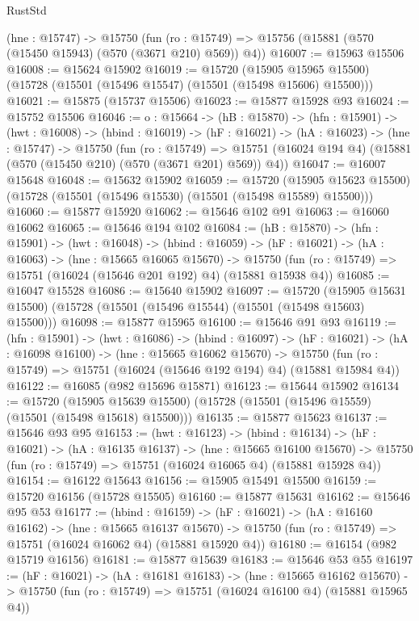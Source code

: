 \begin{lexlean}{RustStd}
\begin{coremodule}
  (hne : @15747) ->
  @15750 (fun (ro : @15749) => @15756 (@15881 (@570 (@15450 @15943) (@570 (@3671 @210) @569)) @4))
@16007 := @15963 @15506
@16008 := @15624 @15902
@16019 := @15720
    (@15905 @15965 @15500)
    (@15728 (@15501 (@15496 @15547) (@15501 (@15498 @15606) @15500)))
@16021 := @15875 (@15737 @15506)
@16023 := @15877 @15928 @93
@16024 := @15752 @15506
@16046 := {o : @15664} ->
  (hB : @15870) ->
  (hfn : @15901) ->
  (hwt : @16008) ->
  (hbind : @16019) ->
  (hF : @16021) ->
  (hA : @16023) ->
  (hne : @15747) ->
  @15750
    (fun (ro : @15749) =>
    @15751 (@16024 @194 @4) (@15881 (@570 (@15450 @210) (@570 (@3671 @201) @569)) @4))
@16047 := @16007 @15648
@16048 := @15632 @15902
@16059 := @15720
    (@15905 @15623 @15500)
    (@15728 (@15501 (@15496 @15530) (@15501 (@15498 @15589) @15500)))
@16060 := @15877 @15920
@16062 := @15646 @102 @91
@16063 := @16060 @16062
@16065 := @15646 @194 @102
@16084 := (hB : @15870) ->
  (hfn : @15901) ->
  (hwt : @16048) ->
  (hbind : @16059) ->
  (hF : @16021) ->
  (hA : @16063) ->
  (hne : @15665 @16065 @15670) ->
  @15750 (fun (ro : @15749) => @15751 (@16024 (@15646 @201 @192) @4) (@15881 @15938 @4))
@16085 := @16047 @15528
@16086 := @15640 @15902
@16097 := @15720
    (@15905 @15631 @15500)
    (@15728 (@15501 (@15496 @15544) (@15501 (@15498 @15603) @15500)))
@16098 := @15877 @15965
@16100 := @15646 @91 @93
@16119 := (hfn : @15901) ->
  (hwt : @16086) ->
  (hbind : @16097) ->
  (hF : @16021) ->
  (hA : @16098 @16100) ->
  (hne : @15665 @16062 @15670) ->
  @15750 (fun (ro : @15749) => @15751 (@16024 (@15646 @192 @194) @4) (@15881 @15984 @4))
@16122 := @16085 (@982 @15696 @15871)
@16123 := @15644 @15902
@16134 := @15720
    (@15905 @15639 @15500)
    (@15728 (@15501 (@15496 @15559) (@15501 (@15498 @15618) @15500)))
@16135 := @15877 @15623
@16137 := @15646 @93 @95
@16153 := (hwt : @16123) ->
  (hbind : @16134) ->
  (hF : @16021) ->
  (hA : @16135 @16137) ->
  (hne : @15665 @16100 @15670) ->
  @15750 (fun (ro : @15749) => @15751 (@16024 @16065 @4) (@15881 @15928 @4))
@16154 := @16122 @15643
@16156 := @15905 @15491 @15500
@16159 := @15720 @16156 (@15728 @15505)
@16160 := @15877 @15631
@16162 := @15646 @95 @53
@16177 := (hbind : @16159) ->
  (hF : @16021) ->
  (hA : @16160 @16162) ->
  (hne : @15665 @16137 @15670) ->
  @15750 (fun (ro : @15749) => @15751 (@16024 @16062 @4) (@15881 @15920 @4))
@16180 := @16154 (@982 @15719 @16156)
@16181 := @15877 @15639
@16183 := @15646 @53 @55
@16197 := (hF : @16021) ->
  (hA : @16181 @16183) ->
  (hne : @15665 @16162 @15670) ->
  @15750 (fun (ro : @15749) => @15751 (@16024 @16100 @4) (@15881 @15965 @4))

\end{coremodule}
\end{lexlean}
